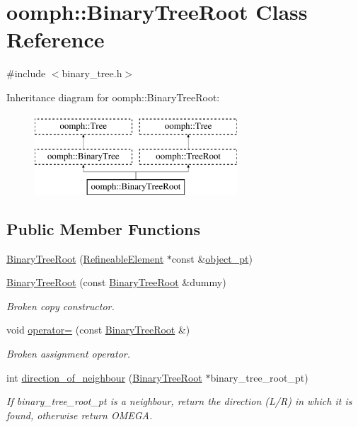 \hypertarget{classoomph_1_1BinaryTreeRoot}{}\section{oomph\+:\+:Binary\+Tree\+Root Class Reference}
\label{classoomph_1_1BinaryTreeRoot}


{\ttfamily \#include $<$binary\+\_\+tree.\+h$>$}

Inheritance diagram for oomph\+:\+:Binary\+Tree\+Root\+:\begin{figure}[H]
\begin{center}
\leavevmode
\includegraphics[height=3.000000cm]{classoomph_1_1BinaryTreeRoot}
\end{center}
\end{figure}
\subsection*{Public Member Functions}
\begin{DoxyCompactItemize}
\item 
\hyperlink{classoomph_1_1BinaryTreeRoot_a0041d849b67407699770118eaa06b52a}{Binary\+Tree\+Root} (\hyperlink{classoomph_1_1RefineableElement}{Refineable\+Element} $\ast$const \&\hyperlink{classoomph_1_1Tree_a2f2eeb0f1dd161f696cccc652974ff4c}{object\+\_\+pt})
\item 
\hyperlink{classoomph_1_1BinaryTreeRoot_adadf7a81e693afcc94ee2ac1446730f0}{Binary\+Tree\+Root} (const \hyperlink{classoomph_1_1BinaryTreeRoot}{Binary\+Tree\+Root} \&dummy)
\begin{DoxyCompactList}\small\item\em Broken copy constructor. \end{DoxyCompactList}\item 
void \hyperlink{classoomph_1_1BinaryTreeRoot_a1916638c64e0be6660bad778bf942576}{operator=} (const \hyperlink{classoomph_1_1BinaryTreeRoot}{Binary\+Tree\+Root} \&)
\begin{DoxyCompactList}\small\item\em Broken assignment operator. \end{DoxyCompactList}\item 
int \hyperlink{classoomph_1_1BinaryTreeRoot_a2068dd13b3a8636bbcde996e39dc7d1c}{direction\+\_\+of\+\_\+neighbour} (\hyperlink{classoomph_1_1BinaryTreeRoot}{Binary\+Tree\+Root} $\ast$binary\+\_\+tree\+\_\+root\+\_\+pt)
\begin{DoxyCompactList}\small\item\em If binary\+\_\+tree\+\_\+root\+\_\+pt is a neighbour, return the direction (L/R) in which it is found, otherwise return O\+M\+E\+GA. \end{DoxyCompactList}\end{DoxyCompactItemize}
